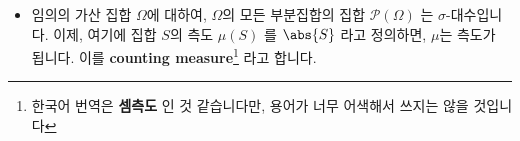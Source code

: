 \begin{itemize}
    \item 임의의 가산 집합 $\Omega$에 대하여, $\Omega$의 모든 부분집합의 집합 $\mathcal{P}(\Omega)$ 는 $\sigma$-대수입니다. 이제, 여기에 집합 $S$의 측도 $\mu(S)$ 를 $\abs{S}$ 라고 정의하면, $\mu$는 측도가 됩니다. 이를 \textbf{counting measure}\footnote{한국어 번역은 \textbf{셈측도} 인 것 같습니다만, 용어가 너무 어색해서 쓰지는 않을 것입니다} 라고 합니다. 
\end{itemize}
